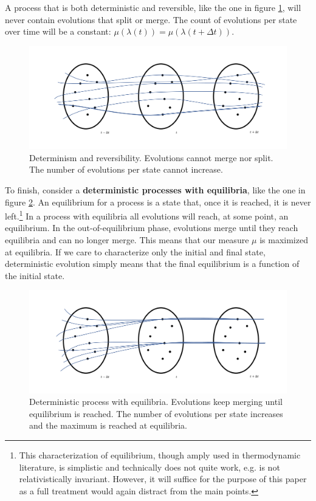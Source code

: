 \documentclass[letterpaper,twocolumn]{article}
\begin{document}
A process that is both deterministic and reversible, like the one in figure \ref{fig_detrev}, will never contain evolutions that split or merge. The count of evolutions per state over time will be a constant: $\mu(\lambda(t)) = \mu(\lambda(t + \Delta t))$.

\begin{figure}[h!]
	\includegraphics[width=\columnwidth]{images/Slide5.png}
	\caption{Determinism and reversibility. Evolutions cannot merge nor split. The number of evolutions per state cannot increase.} \label{fig_detrev}
\end{figure}


To finish, consider a \textbf{deterministic processes with equilibria}, like the one in figure \ref{fig_with_equilibria}. An equilibrium for a process is a state that, once it is reached, it is never left.\footnote{This characterization of equilibrium, though amply used in thermodynamic literature, is simplistic and technically does not quite work, e.g. is not relativistically invariant. However, it will suffice for the purpose of this paper as a full treatment would again distract from the main points.} In a process with equilibria all evolutions will reach, at some point, an equilibrium. In the out-of-equilibrium phase, evolutions merge until they reach equilibria and can no longer merge. This means that our measure $\mu$ is maximized at equilibria. If we care to characterize only the initial and final state, deterministic evolution simply means that the final equilibrium is a function of the initial state.

\begin{figure}[h]
	\includegraphics[width=\columnwidth]{images/Slide6.png}
	\caption{Deterministic process with equilibria. Evolutions keep merging until equilibrium is reached. The number of evolutions per state increases and the maximum is reached at equilibria.}\label{fig_with_equilibria}
\end{figure}
\end{document}
